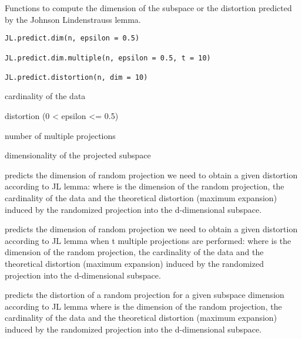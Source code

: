 \documentclass{article}
\begin{document}
\begin{Description}\relax
Functions to compute the dimension of the subspace or the distortion predicted by the Johnson Lindenstrauss lemma.
\end{Description}
\begin{Usage}
\begin{verbatim}
JL.predict.dim(n, epsilon = 0.5)

JL.predict.dim.multiple(n, epsilon = 0.5, t = 10)

JL.predict.distortion(n, dim = 10)
\end{verbatim}
\end{Usage}
\begin{Arguments}
\begin{ldescription}
\item[\code{n}] cardinality of the data 
\item[\code{epsilon}] distortion (0 < epsilon <= 0.5) 
\item[\code{t}] number of multiple projections 
\item[\code{dim}] dimensionality of the projected subspace 
\end{ldescription}
\end{Arguments}
\begin{Details}\relax
{} predicts  the dimension of random projection we need to obtain a given distortion according 
to JL lemma:
where  is the dimension of the random projection,  the cardinality of the data and 
 the theoretical distortion (maximum expansion) induced by the randomized projection into the
d-dimensional subspace.

 predicts  the dimension of random projection we need to obtain a given distortion according 
to JL lemma when t multiple projections are performed:
where  is the dimension of the random projection,  the cardinality of the data and 
 the theoretical distortion (maximum expansion) induced by the randomized projection into the
d-dimensional subspace.

 predicts  the  distortion of a random projection for a given subspace dimension according 
to JL lemma
where  is the dimension of the random projection,  the cardinality of the data and 
 the theoretical distortion (maximum expansion) induced by the randomized projection into the
d-dimensional subspace.
\end{Details}
\end{document}
